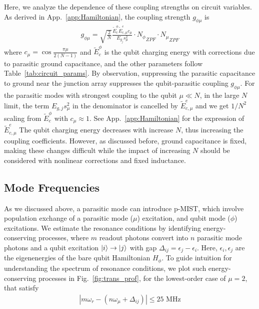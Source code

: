 \documentclass[%
reprint,
superscriptaddress,
 amsmath,amssymb,
 aps,
 prx,
longbibliography,
floatfix,
]{revtex4-2}
\begin{document}
Here, we analyze the dependence of these coupling strengths on circuit variables. As derived in App.~\ref{app:Hamiltonian}, the coupling strength $g_{\phi \mu}$ is
\begin{align}
g_{\phi\mu}=\sqrt{\frac{2}{N}} \frac{\tilde{E}^\phi_c\tilde{E}^e_{c,\mu}c_\mu}{E_{g_j}s_\mu^2}     \cdot {N_\phi}_{ZPF} \cdot {N_\mu}_{ZPF}
\end{align}
where $c_\mu=\cos{\frac{\pi\mu}{2(N-1)}}$ and $\tilde{E}_c^\phi$ is the qubit charging energy with corrections due to parasitic ground capacitance, and the other parameters follow Table~\ref{tab:circuit_params}. By observation, suppressing the parasitic capacitance to ground near the junction array suppresses the qubit-parasitic coupling $g_{\phi\mu}$. For the parasitic modes with strongest coupling to the qubit $\mu\ll N$, in the large $N$ limit, the term $E_{g,j} s_\mu^2$ in the denominator is cancelled by $\tilde{E}^e_{c,\mu}$ and we get $1/N^2$ scaling from $\tilde{E}^\phi_c$ with $c_\mu\approx 1$. See App.~\ref{app:Hamiltonian} for the expression of $\tilde{E}^e_{c,\mu}$ The qubit charging energy decreases with increase $N$, thus increasing the coupling coefficients. However, as discussed before, ground capacitance is fixed, making these changes difficult while the impact of increasing $N$ should be considered with nonlinear corrections and fixed inductance. 

\subsection{Mode Frequencies}
As we discussed above, a parasitic mode can introduce p-MIST, which involve population exchange of a parasitic mode ($\mu$) excitation, and qubit mode  ($\phi$) excitations. We estimate the resonance conditions by identifying  energy-conserving processes, where $m$ readout photons convert into $n$ parasitic mode photons and a qubit excitation $\ket{i} \rightarrow \ket{j}$ with gap $\Delta_{ij}=\epsilon_j-\epsilon_i$. Here, $\epsilon_i,\epsilon_j$ are the eigenenergies of the bare qubit Hamiltonian $H_\phi$. To guide intuition for understanding the spectrum of resonance conditions, we plot such energy-conserving processes in Fig.~\ref{fig:trans_prof}, for the lowest-order case of $\mu=2$, that satisfy
\begin{align}
    |m\omega_r-(n\omega_\mu+\Delta_{ij})|\le 25 \textrm{ MHz}
    \label{eq:En_cons}
\end{align}
\end{document}
